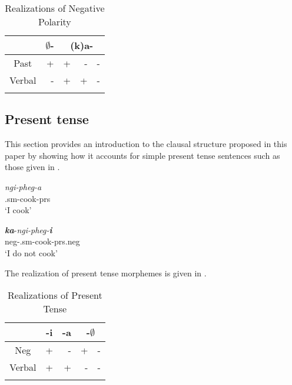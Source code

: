 \documentclass[output=paper]{langsci/langscibook}
\begin{document}
\begin{table}
\caption{Realizations of Negative Polarity} %
\centering %
\begin{tabular}{c r|rrr} %
\lsptoprule%
 &\multicolumn{1}{c}{$\emptyset$-} &\multicolumn{3}{|c}{(k)a-} \\ %
\midrule%
Past & + & + & - & -\\ %
Verbal & - & + & +& -\\[1ex] %
\lspbottomrule%
\end{tabular} 
\label{tab:burkholder:2}
\end{table} 






\subsection{Present tense}\label{sec:burkholder:2.2}

This section provides an introduction to the clausal structure proposed in this paper by showing how it accounts for simple present tense sentences such as those given in .
 

\begin{exe}
\ex\label{ex:burkholder:4}  
\begin{xlist}
\ex\label{ex:burkholder:4a} 
\gll  \textit{ngi-pheg-a}\\
          .{\sc sm}-cook-\sc prs\\
    \glt `I cook'

\ex\label{ex:burkholder:4b}  
\gll  \textit{\textbf{ka}}-\textit{ngi-pheg-\textbf{i}}\\
          {\sc neg}-.{\sc sm}-cook-{\sc prs.neg}\\
    \glt `I do not cook'
\end{xlist}
\end{exe}
 
 
The realization of present tense morphemes is given in .

\begin{table}
\caption{Realizations of Present Tense} %
\centering %
\begin{tabular}{c r|r|rr} %
\lsptoprule%
 &\multicolumn{1}{c}{-i}& \multicolumn{1}{|c|}{-a}& \multicolumn{2}{|c}{-$\emptyset$} \\ %
\midrule%
Neg & + & - & + & -\\ %
Verbal & + & + & -& -\\[1ex] %
\lspbottomrule%
\end{tabular}
\label{tab:burkholder:3}
\end{table} 
\end{document}
